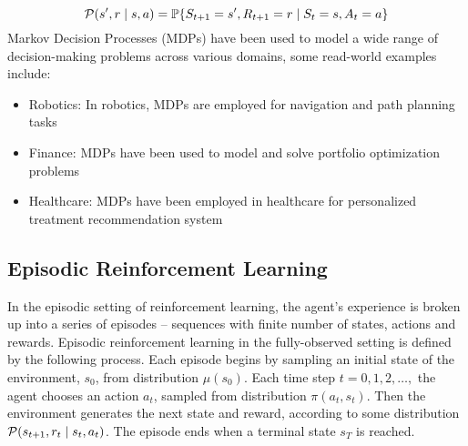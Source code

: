 \begin{equation}
    \mathcal P(s', r \mid s, a) = \mathbb{P}\{S_{t+1} = s', R_{t+1} = r \mid S_t = s, A_t = a\}
\end{equation}
Markov Decision Processes (MDPs) have been used to model a wide range of decision-making problems across various domains, some read-world examples include:
\begin{itemize}
    \item Robotics: In robotics, MDPs are employed for navigation and path planning tasks \cite{thrun2005}
    \item Finance: MDPs have been used to model and solve portfolio optimization problems \cite{buehler2019}
    \item Healthcare: MDPs have been employed in healthcare for personalized treatment recommendation system 
    \cite{komorowski2018}
\end{itemize}

\subsection{Episodic Reinforcement Learning}

In the episodic setting of reinforcement learning, the agent's experience is broken up into a series of episodes -- sequences with finite  number of states, actions and rewards. Episodic reinforcement learning in the fully-observed setting is defined by the following process. Each episode begins by sampling an initial state of the environment, $s_0$, from distribution $\mu(s_0)$. Each time step $t = 0,1,2, \dots,$ the agent chooses an action $a_t$, sampled from distribution $\pi(a_t, s_t)$. Then the environment generates the next state and reward, according to some distribution $\mathcal P(s_{t+1}, r_t \mid s_t, a_t)$. The episode ends when a terminal state $s_T$ is reached. 





